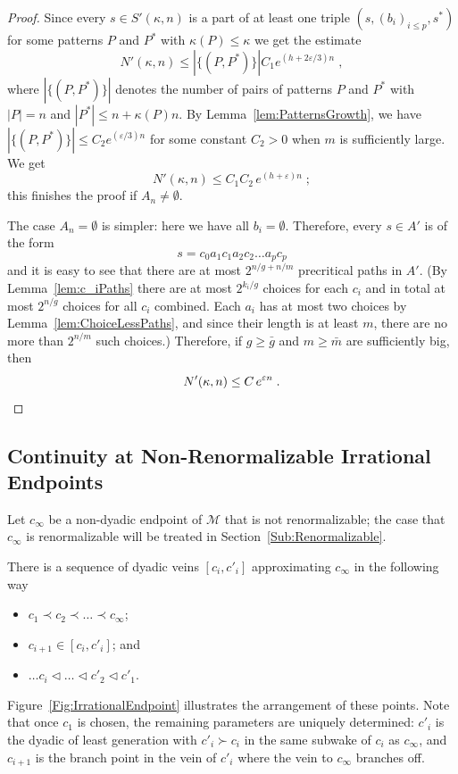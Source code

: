 \documentclass[12pt]{amsart}
\newcommand{\M}{\mathscr M}
\newcommand{\0}{\texttt{0}}
\newcommand{\1}{\texttt{1}}
\newcommand\eps{\varepsilon}
\theoremstyle{definition}
\numberwithin{equation}{section}
\newcounter{reminder}[section]
\newcounter{treminder}
\newcommand{\reminder}[1]{\stepcounter{reminder}\stepcounter{treminder}$\rhd$\textsl{#1}$\lhd$\marginpar{\thesection.\arabic{reminder}$\lhd\rhd\lhd\rhd\lhd\rhd$}}
\renewcommand{\reminder}[1]{}
\begin{document}
\begin{proof}
Since every $s\in S'(\kappa,n)$ is a part of at least one triple $(s,(b_i)_{i\le p},s^*)$ for some patterns $P$ and $P^*$ with $\kappa(P)\le \kappa$ we get the estimate 
\[
N'(\kappa, n)\le  \left|\{(P,P^*)\}\right| C_1  e^{(h+2\eps/3) n} 
\;,
\]
where $\left|\{(P,P^*)\}\right|$ denotes the number of pairs of patterns $P$ and $P^*$ with $|P|=n$ and $|P^*|\le n+\kappa(P)n$. By Lemma~\ref{lem:PatternsGrowth}, we have $\left|\{(P,P^*)\}\right| \le C_2e^{(\eps/3) n}$ for some constant $C_2>0$ when $m$ is sufficiently large. We get 
\[
N'(\kappa, n)\le C_1C_2 \,  e^{(h+\eps) n} 
\;;
\]
this finishes the proof if $A_n\neq\emptyset$.


The case $A_n=\emptyset$ is simpler: here we have all $b_i=\emptyset$. Therefore, every $s\in A'$ is of the form
\[
s=c_0 a_1c_1a_2c_2\dots a_pc_p
\]
and it is easy to see that there are at most $ 2^{{n}/{g}+{n}/{m}}$ precritical paths in $A'$. (By Lemma~\ref{lem:c_iPaths} there are at most $2^{k_i/g}$ choices for each $c_i$ and in total at most $2^{n/g}$ choices for all $c_i$ combined. Each $a_i$ has at most two choices by Lemma~\ref{lem:ChoiceLessPaths}, and since their length is at least $m$, there are no more than $2^{n/m}$ such choices.)  Therefore, if $g\ge \bar g$ and $m\ge \bar m$ are sufficiently big, then 
\[
N'(\kappa, n)\le C \,  e^{\eps n} 
\;. \qedhere
\]
\end{proof}



\subsection{Continuity at Non-Renormalizable Irrational Endpoints}
Let $c_{\infty}$ be a non-dyadic endpoint of $\M$ that is not renormalizable; the case that $c_\infty$ is renormalizable will be treated in Section~\ref{Sub:Renormalizable}.

There is a sequence of dyadic veins $[c_i,c'_i]$ approximating $c_{\infty}$ in the following way \reminder{should we replace $i$ by $\nu$, because $i$ is in different use?}
\begin{itemize}
\item $c_1\prec c_2\prec\dots \prec c_{\infty}$;  
\item $c_{i+1}\in [c_i,c'_i]$; and
\item $ \dots c_i \lhd \dots \lhd  c'_2\lhd c'_1$.
\end{itemize}
Figure~\ref{Fig:IrrationalEndpoint} illustrates the arrangement of these points.
Note that once $c_1$ is chosen, the remaining parameters are uniquely determined: $c'_i$ is the dyadic of least generation with $c'_i\succ c_i$ {in the same subwake of $c_i$ as $c_\infty$}, and $c_{i+1}$ is the branch point in the vein of $c'_i$ where the vein to $c_\infty$ branches off.
\end{document}
